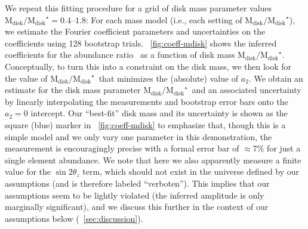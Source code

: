 \documentclass[modern]{aastex63}
\newcommand{\mdisk}{\ensuremath{\mathrm{M}_\mathrm{disk}}}
\newcommand{\mratio}{\ensuremath{\mdisk / \mdisk^\star}}
\begin{document}
We repeat this fitting procedure for a grid of disk mass parameter values
$\mratio = 0.4$--$1.8$:
For each mass model (i.e., each setting of \mratio), we estimate the Fourier
coefficient parameters and uncertainties on the coefficients using 128 bootstrap
trials.
\figurename~\ref{fig:coeff-mdisk} shows the inferred coefficients for the
abundance ratio \mgfe\ as a function of disk mass \mratio.
Conceptually, to turn this into a constraint on the disk mass, we then look for
the value of \mratio\ that minimizes the (absolute) value of $a_2$.
We obtain an estimate for the disk mass parameter \mratio\ and an associated
uncertainty by linearly interpolating the measurements and bootstrap error bars
onto the $a_2=0$ intercept.
Our ``best-fit'' disk mass and its uncertainty is shown as the square (blue)
marker in \figurename~\ref{fig:coeff-mdisk} to emphasize that, though this is a
simple model and we only vary one parameter in this demonstration, the
measurement is encouragingly precise with a formal error bar of $\approx$7\% for
just a single element abundance.
We note that here we also apparently measure a finite value for the $\sin
2\theta_z$ term, which should not exist in the universe defined by our
assumptions (and is therefore labeled ``verboten'').
This implies that our assumptions seem to be lightly violated (the inferred
amplitude is only marginally significant), and we discuss this further in the
context of our assumptions below (\sectionname~\ref{sec:discussion}).
\end{document}

